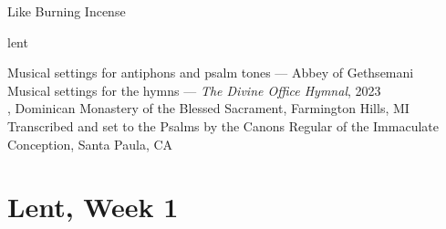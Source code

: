 \documentclass{lbi_cantor_letter}
\begin{document}
\pagestyle{empty}
\onecolumn

\null\vfill
\begin{center}
  \huge Like Burning Incense

  \bigskip\LARGE lent

  \vfill\vfill\null

\end{center}


\newpage

\null\vfill
\begin{center}
  \vfill\small
  Musical settings for antiphons and psalm tones --- Abbey of Gethsemani\\
  Musical settings for the hymns --- \emph{The Divine Office Hymnal}, 2023\\
  , Dominican Monastery of the Blessed Sacrament, Farmington Hills, MI\\
  Transcribed and set to the Psalms by the Canons Regular of the Immaculate Conception, Santa Paula, CA
\end{center}

\newpage

\begin{KeepFromToc}
  \tableofcontents
\end{KeepFromToc}

\restoregeometry
\pagestyle{fancy}


\twocolumn


\chapter{Lent, Week 1}
\end{document}
